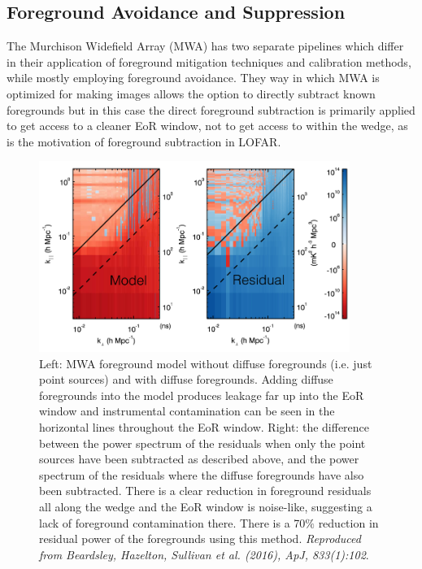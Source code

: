 \subsection{Foreground Avoidance and Suppression}

The Murchison Widefield Array (MWA) has two separate pipelines which differ in their application of foreground mitigation techniques and calibration methods, while mostly employing foreground avoidance. They way in which MWA is optimized for making images allows the option to directly subtract known foregrounds but in this case the direct foreground subtraction is primarily applied to get access to a cleaner EoR window, not to get access to within the wedge, as is the motivation of foreground subtraction in LOFAR.

\begin{figure}
\begin{center}
    \includegraphics[width=0.9\textwidth]{Chapman_Jelic/Images/apjaa3b64f9_hr.png}
\end{center}
\caption{Left: MWA foreground model without diffuse foregrounds (i.e. just point sources) and with diffuse foregrounds. Adding diffuse foregrounds into the model produces leakage far up into the EoR window and instrumental contamination can be seen in the horizontal lines throughout the EoR window. Right: the difference between the power spectrum of the residuals when only the point sources have been subtracted as described above, and the power spectrum of the residuals where the diffuse foregrounds have also been subtracted. There is a clear reduction in foreground residuals all along the wedge and the EoR window is noise-like, suggesting a lack of foreground contamination there. There is a 70$\%$ reduction in residual power of the foregrounds using this method. \textit{Reproduced from Beardsley, Hazelton, Sullivan et al. (2016), ApJ, 833(1):102}.}
    \label{fig:beardsley_fg_sub}
\end{figure}

